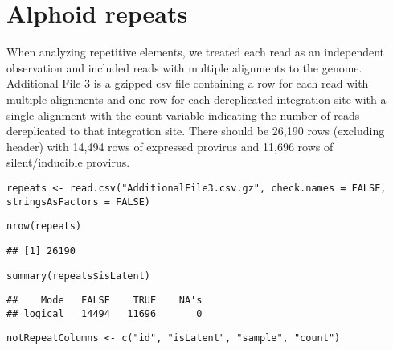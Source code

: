 \documentclass[../../sherrill-Mix_thesis.tex]{subfiles}
\makeatletter
\newenvironment{kframe}{%
 \def\at@end@of@kframe{}%
 \ifinner\ifhmode%
  \def\at@end@of@kframe{\end{minipage}}%
  \begin{minipage}{\columnwidth}%
 \fi\fi%
 \def\FrameCommand##1{\hskip\@totalleftmargin \hskip-\fboxsep
 \colorbox{shadecolor}{##1}\hskip-\fboxsep
     \hskip-\linewidth \hskip-\@totalleftmargin \hskip\columnwidth}%
 \MakeFramed {\advance\hsize-\width
   \@totalleftmargin\z@ \linewidth\hsize
   \@setminipage}}%
 {\par\unskip\endMakeFramed%
 \at@end@of@kframe}
\newenvironment{knitrout}{}{} %
\makeatother
\begin{document}
\section{Alphoid repeats}
When analyzing repetitive elements, we treated each read as an independent observation and included reads with multiple alignments to the genome. Additional File 3 is a gzipped csv file containing a row for each read with multiple alignments and one row for each dereplicated integration site with a single alignment with the count variable indicating the number of reads dereplicated to that integration site. There should be 26,190 rows (excluding header) with 14,494 rows of expressed provirus and 11,696 rows of silent/inducible provirus.
\begin{knitrout}
\color{fgcolor}\begin{kframe}
\begin{lstlisting}[basicstyle=\ttfamily,breaklines=true]
repeats <- read.csv("AdditionalFile3.csv.gz", check.names = FALSE, stringsAsFactors = FALSE)\end{lstlisting}
\begin{lstlisting}[basicstyle=\ttfamily,breaklines=true]
nrow(repeats)\end{lstlisting}
\begin{lstlisting}[basicstyle=\ttfamily,breaklines=true]
## [1] 26190
\end{lstlisting}
\begin{lstlisting}[basicstyle=\ttfamily,breaklines=true]
summary(repeats$isLatent)\end{lstlisting}
\begin{lstlisting}[basicstyle=\ttfamily,breaklines=true]
##    Mode   FALSE    TRUE    NA's 
## logical   14494   11696       0
\end{lstlisting}
\begin{lstlisting}[basicstyle=\ttfamily,breaklines=true]
notRepeatColumns <- c("id", "isLatent", "sample", "count")\end{lstlisting}
\end{kframe}
\end{knitrout}
\end{document}
